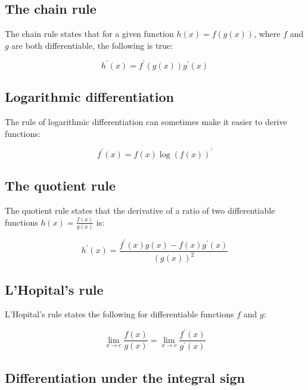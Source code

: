 \documentclass{report}
\begin{document}
\subsection{The chain rule}

The chain rule states that for a given function $h(x) = f(g(x))$, where $f$ and $g$ are both differentiable, the following is true:

\begin{equation}\label{eq:chain-rule}
    h^\prime(x) = f^\prime(g(x))g^\prime(x)
\end{equation}

\subsection{Logarithmic differentiation}

The rule of logarithmic differentiation can sometimes make it easier to derive functions:

\begin{equation}\label{eq:logarithmic-differentiation}
    f^\prime(x) = f(x) \log(f(x))^\prime
\end{equation}

\subsection{The quotient rule}

The quotient rule states that the derivative of a ratio of two differentiable functions $h(x) = \frac{f(x)}{g(x)}$ is:

\begin{equation}\label{eq:quotient-rule}
    h^\prime(x) = \frac{f^\prime(x)g(x) - f(x)g^\prime(x)}{\left(g(x)\right)^2}
\end{equation}

\subsection{L'Hopital's rule}

L'Hopital's rule states the following for differentiable functions $f$ and $g$:

\begin{equation}\label{eq:lhopitals-rule}
    \lim_{x\to c} \frac{f(x)}{g(x)} = \lim_{x\to c} \frac{f^\prime(x)}{g^\prime(x)}
\end{equation}

\subsection{Differentiation under the integral sign}
\end{document}
